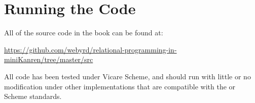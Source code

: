 














\section{Running the Code}\label{sec:preface:code}

All of the source code in the book can be found at:

\noindent
\url{https://github.com/webyrd/relational-programming-in-miniKanren/tree/master/src}


\noindent 
All code has been tested under Vicare Scheme, and should run with little or no modification under other implementations that are compatible with the \RfiveRSsp or \RsixRSsp{} Scheme standards.




